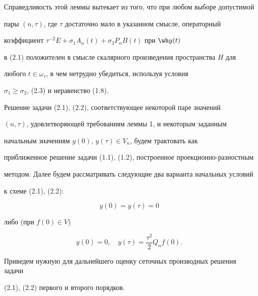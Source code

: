 Справедливость этой леммы вытекает из того, что при любом выборе допустимой


пары $(n,\tau)$, где $\tau$ достаточно мало в указанном смысле, операторный


коэффициент $\tau^{-2}E+\sigma_1A_n(t)+\sigma_3P_nB(t)$ при $\wh y(t)$


в (2.1) положителен в смысле скалярного произведения пространства $H$ для


любого $t\in\omega_\tau$, в чем нетрудно убедиться, используя условия


$\sigma_1\ge \sigma_2$, (2.3) и неравенство (1.8).





Решение задачи (2.1), (2.2), соответствующее некоторой паре значений


$(n,\tau)$, удовлетворяющей требованиям леммы 1, и некоторым заданным


начальным значениям $y(0)$, $y(\tau)\in V_n$, будем трактовать как


приближенное решение задачи (1.1), (1.2), построенное проекционно-разностным


методом. Далее будем рассматривать следующие два варианта начальных условий


к схеме (2.1), (2.2):


\begin{equation}


y(0)=y(\tau)=0


\end{equation}


либо (при $f(0)\in V$)


\begin{equation}


y(0)=0,\quad y(\tau)=\frac{\tau^2}2Q_nf(0).


\end{equation}





Приведем нужную для дальнейшего оценку сеточных производных решения задачи


(2.1), (2.2) первого и второго порядков.





